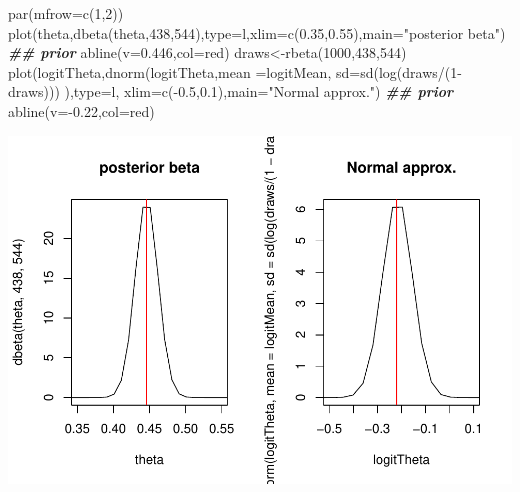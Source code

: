 \documentclass[
]{book}
\newenvironment{Shaded}{\begin{snugshade}}{\end{snugshade}}
\newcommand{\AttributeTok}[1]{\textcolor[rgb]{0.77,0.63,0.00}{#1}}
\newcommand{\DecValTok}[1]{\textcolor[rgb]{0.00,0.00,0.81}{#1}}
\newcommand{\DocumentationTok}[1]{\textcolor[rgb]{0.56,0.35,0.01}{\textbf{\textit{#1}}}}
\newcommand{\FloatTok}[1]{\textcolor[rgb]{0.00,0.00,0.81}{#1}}
\newcommand{\FunctionTok}[1]{\textcolor[rgb]{0.00,0.00,0.00}{#1}}
\newcommand{\NormalTok}[1]{#1}
\newcommand{\OtherTok}[1]{\textcolor[rgb]{0.56,0.35,0.01}{#1}}
\newcommand{\SpecialCharTok}[1]{\textcolor[rgb]{0.00,0.00,0.00}{#1}}
\newcommand{\StringTok}[1]{\textcolor[rgb]{0.31,0.60,0.02}{#1}}
\theoremstyle{definition}
\theoremstyle{definition}
\theoremstyle{definition}
\theoremstyle{definition}
\theoremstyle{remark}
\begin{document}
\begin{Shaded}
\begin{Highlighting}[]
  \FunctionTok{par}\NormalTok{(}\AttributeTok{mfrow=}\FunctionTok{c}\NormalTok{(}\DecValTok{1}\NormalTok{,}\DecValTok{2}\NormalTok{))}
    \FunctionTok{plot}\NormalTok{(theta,}\FunctionTok{dbeta}\NormalTok{(theta,}\DecValTok{438}\NormalTok{,}\DecValTok{544}\NormalTok{),}\AttributeTok{type=}\StringTok{\textquotesingle{}l\textquotesingle{}}\NormalTok{,}\AttributeTok{xlim=}\FunctionTok{c}\NormalTok{(}\FloatTok{0.35}\NormalTok{,}\FloatTok{0.55}\NormalTok{),}\AttributeTok{main=}\StringTok{"posterior beta"}\NormalTok{) }\DocumentationTok{\#\# prior}
    \FunctionTok{abline}\NormalTok{(}\AttributeTok{v=}\FloatTok{0.446}\NormalTok{,}\AttributeTok{col=}\StringTok{\textquotesingle{}red\textquotesingle{}}\NormalTok{)}
\NormalTok{  draws}\OtherTok{\textless{}{-}}\FunctionTok{rbeta}\NormalTok{(}\DecValTok{1000}\NormalTok{,}\DecValTok{438}\NormalTok{,}\DecValTok{544}\NormalTok{)}
  \FunctionTok{plot}\NormalTok{(logitTheta,}\FunctionTok{dnorm}\NormalTok{(logitTheta,}\AttributeTok{mean =}\NormalTok{logitMean, }\AttributeTok{sd=}\FunctionTok{sd}\NormalTok{(}\FunctionTok{log}\NormalTok{(draws}\SpecialCharTok{/}\NormalTok{(}\DecValTok{1}\SpecialCharTok{{-}}\NormalTok{draws))) ),}\AttributeTok{type=}\StringTok{\textquotesingle{}l\textquotesingle{}}\NormalTok{, }\AttributeTok{xlim=}\FunctionTok{c}\NormalTok{(}\SpecialCharTok{{-}}\FloatTok{0.5}\NormalTok{,}\FloatTok{0.1}\NormalTok{),}\AttributeTok{main=}\StringTok{"Normal approx."}\NormalTok{) }\DocumentationTok{\#\# prior}
    \FunctionTok{abline}\NormalTok{(}\AttributeTok{v=}\SpecialCharTok{{-}}\FloatTok{0.22}\NormalTok{,}\AttributeTok{col=}\StringTok{\textquotesingle{}red\textquotesingle{}}\NormalTok{)}
\end{Highlighting}
\end{Shaded}

\includegraphics{_main_files/figure-latex/unnamed-chunk-12-1.pdf}
\end{document}
